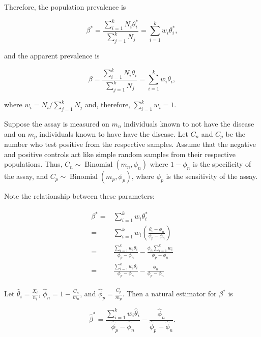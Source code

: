 \documentclass[AMA,STIX1COL]{WileyNJD-v2}
\begin{document}
Therefore, the population prevalence is 

\begin{equation}
    \beta^* = \frac{\sum_{i=1}^k N_i \theta_i^*}{\sum_{j=1}^k N_j} = \sum_{i=1}^k w_i \theta_i^*,
    \label{eq:pop-prev}
\end{equation}

and the apparent prevalence is 

\begin{equation}
    \beta = \frac{\sum_{i=1}^k N_i \theta_i}{\sum_{j=1}^k N_j} = \sum_{i=1}^k w_i \theta_i,
    \label{eq:app-prev}
\end{equation}

where \( w_i = N_i / \sum_{j=1}^k N_j \) and, therefore, \( \sum_{i=1}^k w_i = 1 \).

Suppose the assay is measured on \( m_n \) individuals known to not have the disease and on \( m_p \) individuals known to have have the disease.
Let \( C_n \) and \( C_p \) be the number who test positive from the respective samples.
Assume that the negative and positive controls act like simple random samples from their respective populations.
Thus, \( C_n \sim \operatorname{Binomial}(m_n, \phi_n) \) where \( 1 - \phi_n \) is the specificity of the assay, and \( C_p \sim \operatorname{Binomial}(m_p, \phi_p) \), where  \( \phi_p \) is the sensitivity of the assay.

Note the relationship between these parameters:

\begin{align}
\begin{split}
  \beta^*   =&   \sum_{i=1}^k w_i \theta_i^* \\
            =&  \sum_{i=1}^k w_i \left( \frac{\theta_i - \phi_n}{\phi_p - \phi_n} \right) \\
            =&   \frac{\sum_{i=1}^k w_i \theta_i}{\phi_p - \phi_n} - \frac{\phi_n \sum_{i=1}^k w_i}{\phi_p - \phi_n} \\
            =&   \frac{\sum_{i=1}^k w_i \theta_i}{\phi_p - \phi_n} - \frac{\phi_n}{\phi_p - \phi_n}
            \label{eq:long-beta}
\end{split}
\end{align}

Let \( \hat{\theta}_i = \frac{X_i}{n_i} \), \( \hat{\phi}_n = 1 - \frac{C_n}{m_n} \), and \( \hat{\phi}_p = \frac{C_p}{m_p} \).
Then a natural estimator for \( \beta^* \) is 

\begin{equation}
    \hat{\beta}^* = \frac{\sum_{i=1}^k w_i \hat{\theta}_i}{\hat{\phi}_p - \hat{\phi}_n} - \frac{\hat{\phi}_n}{\hat{\phi}_p - \hat{\phi}_n}. \label{eq:betastarhat}
\end{equation}
\end{document}
